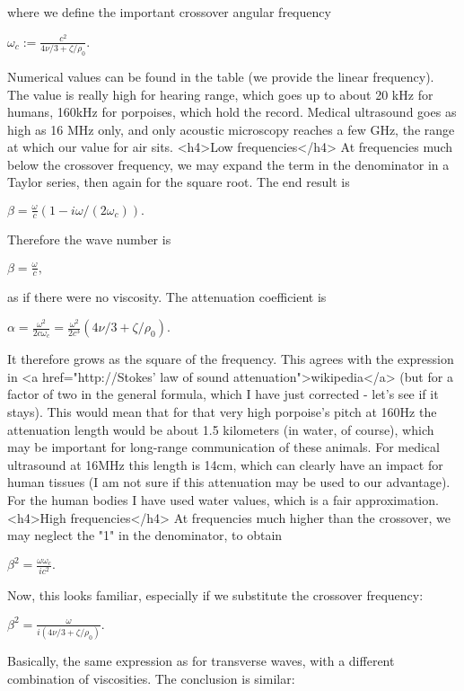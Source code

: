 where we define the important crossover angular frequency

$ \omega_c := \frac{c^2}{4\nu/3+\zeta/\rho_0}.$

Numerical values can be found in the table (we provide the linear frequency). The value is really high for hearing range, which goes up to about 20 kHz for humans, 160kHz for porpoises, which hold the record. Medical ultrasound goes as high as 16 MHz only, and only acoustic microscopy reaches a few GHz, the range at which our value for air sits.
<h4>Low frequencies</h4>
At frequencies much below the crossover frequency, we may expand the term in the denominator in a Taylor series, then again for the square root. The end result is

$ \beta = \frac{\omega}{c} (1-i   \omega/(2 \omega_c)).$

 

Therefore the wave number is

$ \beta = \frac{\omega}{c},$

as if there were no viscosity. The attenuation coefficient is

$ \alpha = \frac{\omega^2}{2 c\omega_c}=\frac{\omega^2}{2 c^3}(4\nu/3+\zeta/\rho_0). $

It therefore grows as the square of the frequency.  This agrees with the expression in <a href="http://Stokes' law of sound attenuation">wikipedia</a> (but for a factor of two in the general formula, which I have just corrected - let's see if it stays). This would mean that for that very high porpoise's pitch at 160Hz the attenuation length would be about 1.5 kilometers (in water, of course), which may be important for long-range communication of these animals. For medical ultrasound at 16MHz this length is 14cm, which can clearly have an impact for human tissues (I am not sure if this attenuation may be used to our advantage). For the human bodies I have used water values, which is a fair approximation.
<h4>High frequencies</h4>
At frequencies much higher than the crossover, we may neglect the "1" in the denominator, to obtain

$ \beta^2 = \frac{\omega\omega_c}{i c^2} .$

Now, this looks familiar, especially if we substitute the crossover frequency:

$ \beta^2 = \frac{\omega}{i(4\nu/3+\zeta/\rho_0)} .$

Basically, the same expression as for transverse waves, with a different combination of viscosities. The conclusion is similar:

